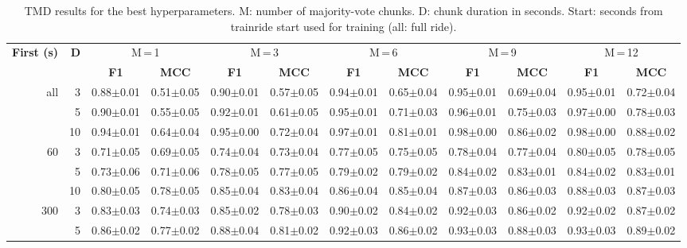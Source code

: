 \begin{table}[htbp]
\centering
\caption{TMD results for the best hyperparameters. M: number of majority-vote chunks. D: chunk duration in seconds. Start: seconds from trainride start used for training (all: full ride).}
\label{tab:tmd_summary}
\begin{tabular}{rrcccccccccc}
\toprule
\multirow[b]{2}{*}{\textbf{First (s)}} & \multirow[b]{2}{*}{\textbf{D}} & \multicolumn{2}{c}{M\,=\,1} & \multicolumn{2}{c}{M\,=\,3} & \multicolumn{2}{c}{M\,=\,6} & \multicolumn{2}{c}{M\,=\,9} & \multicolumn{2}{c}{M\,=\,12} \\
\cmidrule(lr){3-4} \cmidrule(lr){5-6} \cmidrule(lr){7-8} \cmidrule(lr){9-10} \cmidrule(lr){11-12}
 &  & \textbf{F1} & \textbf{MCC} & \textbf{F1} & \textbf{MCC} & \textbf{F1} & \textbf{MCC} & \textbf{F1} & \textbf{MCC} & \textbf{F1} & \textbf{MCC} \\
\midrule
all & 3 & 0.88$\pm$0.01 & 0.51$\pm$0.05 & 0.90$\pm$0.01 & 0.57$\pm$0.05 & 0.94$\pm$0.01 & 0.65$\pm$0.04 & 0.95$\pm$0.01 & 0.69$\pm$0.04 & 0.95$\pm$0.01 & 0.72$\pm$0.04 \\
 & 5 & 0.90$\pm$0.01 & 0.55$\pm$0.05 & 0.92$\pm$0.01 & 0.61$\pm$0.05 & 0.95$\pm$0.01 & 0.71$\pm$0.03 & 0.96$\pm$0.01 & 0.75$\pm$0.03 & 0.97$\pm$0.00 & 0.78$\pm$0.03 \\
 & 10 & 0.94$\pm$0.01 & 0.64$\pm$0.04 & 0.95$\pm$0.00 & 0.72$\pm$0.04 & 0.97$\pm$0.01 & 0.81$\pm$0.01 & 0.98$\pm$0.00 & 0.86$\pm$0.02 & 0.98$\pm$0.00 & 0.88$\pm$0.02 \\
\midrule
60 & 3 & 0.71$\pm$0.05 & 0.69$\pm$0.05 & 0.74$\pm$0.04 & 0.73$\pm$0.04 & 0.77$\pm$0.05 & 0.75$\pm$0.05 & 0.78$\pm$0.04 & 0.77$\pm$0.04 & 0.80$\pm$0.05 & 0.78$\pm$0.05 \\
 & 5 & 0.73$\pm$0.06 & 0.71$\pm$0.06 & 0.78$\pm$0.05 & 0.77$\pm$0.05 & 0.79$\pm$0.02 & 0.79$\pm$0.02 & 0.84$\pm$0.02 & 0.83$\pm$0.01 & 0.84$\pm$0.02 & 0.83$\pm$0.01 \\
 & 10 & 0.80$\pm$0.05 & 0.78$\pm$0.05 & 0.85$\pm$0.04 & 0.83$\pm$0.04 & 0.86$\pm$0.04 & 0.85$\pm$0.04 & 0.87$\pm$0.03 & 0.86$\pm$0.03 & 0.88$\pm$0.03 & 0.87$\pm$0.03 \\
\midrule
300 & 3 & 0.83$\pm$0.03 & 0.74$\pm$0.03 & 0.85$\pm$0.02 & 0.78$\pm$0.03 & 0.90$\pm$0.02 & 0.84$\pm$0.02 & 0.92$\pm$0.03 & 0.86$\pm$0.02 & 0.92$\pm$0.02 & 0.87$\pm$0.02 \\
 & 5 & 0.86$\pm$0.02 & 0.77$\pm$0.02 & 0.88$\pm$0.04 & 0.81$\pm$0.02 & 0.92$\pm$0.03 & 0.86$\pm$0.02 & 0.93$\pm$0.03 & 0.88$\pm$0.03 & 0.93$\pm$0.03 & 0.89$\pm$0.02 \\

\end{tabular}
\end{table}
